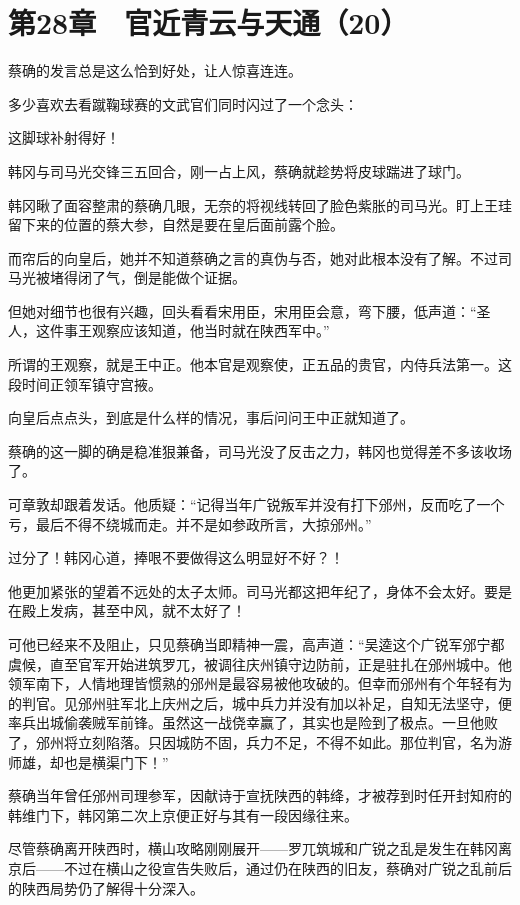 \section{第28章　官近青云与天通（20）}

蔡确的发言总是这么恰到好处，让人惊喜连连。

多少喜欢去看蹴鞠球赛的文武官们同时闪过了一个念头：

这脚球补射得好！

韩冈与司马光交锋三五回合，刚一占上风，蔡确就趁势将皮球踹进了球门。

韩冈瞅了面容整肃的蔡确几眼，无奈的将视线转回了脸色紫胀的司马光。盯上王珪留下来的位置的蔡大参，自然是要在皇后面前露个脸。

而帘后的向皇后，她并不知道蔡确之言的真伪与否，她对此根本没有了解。不过司马光被堵得闭了气，倒是能做个证据。

但她对细节也很有兴趣，回头看看宋用臣，宋用臣会意，弯下腰，低声道：“圣人，这件事王观察应该知道，他当时就在陕西军中。”

所谓的王观察，就是王中正。他本官是观察使，正五品的贵官，内侍兵法第一。这段时间正领军镇守宫掖。

向皇后点点头，到底是什么样的情况，事后问问王中正就知道了。

蔡确的这一脚的确是稳准狠兼备，司马光没了反击之力，韩冈也觉得差不多该收场了。

可章敦却跟着发话。他质疑：“记得当年广锐叛军并没有打下邠州，反而吃了一个亏，最后不得不绕城而走。并不是如参政所言，大掠邠州。”

过分了！韩冈心道，捧哏不要做得这么明显好不好？！

他更加紧张的望着不远处的太子太师。司马光都这把年纪了，身体不会太好。要是在殿上发病，甚至中风，就不太好了！

可他已经来不及阻止，只见蔡确当即精神一震，高声道：“吴逵这个广锐军邠宁都虞候，直至官军开始进筑罗兀，被调往庆州镇守边防前，正是驻扎在邠州城中。他领军南下，人情地理皆惯熟的邠州是最容易被他攻破的。但幸而邠州有个年轻有为的判官。见邠州驻军北上庆州之后，城中兵力并没有加以补足，自知无法坚守，便率兵出城偷袭贼军前锋。虽然这一战侥幸赢了，其实也是险到了极点。一旦他败了，邠州将立刻陷落。只因城防不固，兵力不足，不得不如此。那位判官，名为游师雄，却也是横渠门下！”

蔡确当年曾任邠州司理参军，因献诗于宣抚陕西的韩绛，才被荐到时任开封知府的韩维门下，韩冈第二次上京便正好与其有一段因缘往来。

尽管蔡确离开陕西时，横山攻略刚刚展开——罗兀筑城和广锐之乱是发生在韩冈离京后——不过在横山之役宣告失败后，通过仍在陕西的旧友，蔡确对广锐之乱前后的陕西局势仍了解得十分深入。

